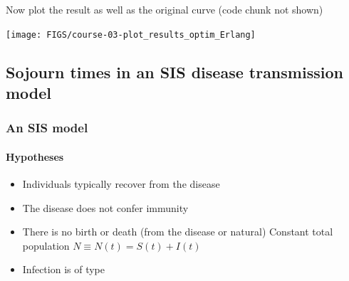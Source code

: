 \documentclass[aspectratio=169]{beamer}\usepackage[]{graphicx}\usepackage[]{xcolor}
\makeatletter
\newcommand{\hlnum}[1]{\textcolor[rgb]{0.686,0.059,0.569}{#1}}%
\newcommand{\hlcom}[1]{\textcolor[rgb]{0.678,0.584,0.686}{\textit{#1}}}%
\newcommand{\hlopt}[1]{\textcolor[rgb]{0,0,0}{#1}}%
\newcommand{\hldef}[1]{\textcolor[rgb]{0.345,0.345,0.345}{#1}}%
\newcommand{\hlkwb}[1]{\textcolor[rgb]{0.69,0.353,0.396}{#1}}%
\newcommand{\hlkwc}[1]{\textcolor[rgb]{0.333,0.667,0.333}{#1}}%
\newcommand{\hlkwd}[1]{\textcolor[rgb]{0.737,0.353,0.396}{\textbf{#1}}}%
\newenvironment{kframe}{%
 \def\at@end@of@kframe{}%
 \ifinner\ifhmode%
  \def\at@end@of@kframe{\end{minipage}}%
  \begin{minipage}{\columnwidth}%
 \fi\fi%
 \def\FrameCommand##1{\hskip\@totalleftmargin \hskip-\fboxsep
 \colorbox{shadecolor}{##1}\hskip-\fboxsep
     \hskip-\linewidth \hskip-\@totalleftmargin \hskip\columnwidth}%
 \MakeFramed {\advance\hsize-\width
   \@totalleftmargin\z@ \linewidth\hsize
   \@setminipage}}%
 {\par\unskip\endMakeFramed%
 \at@end@of@kframe}
\newenvironment{knitrout}{}{} %
\makeatother
\begin{document}



\begin{frame}
Now plot the result as well as the original curve  (code chunk not shown)
\begin{center}
\texttt{[image: FIGS/course-03-plot\_results\_optim\_Erlang]}
\end{center}
\end{frame}






\subsection{Sojourn times in an SIS disease transmission model} 

\begin{frame}\frametitle{An SIS model}
\framesubtitle{Hypotheses}
\begin{itemize}
\item Individuals typically recover from the disease
\vfill
\item The disease does not confer immunity
\vfill
\item There is no birth or death (from the disease or natural) \newline\imply\;
Constant total population $N\equiv N(t)=S(t)+I(t)$
\vfill
\item Infection is of  type
\end{itemize}
\end{frame}
\end{document}
